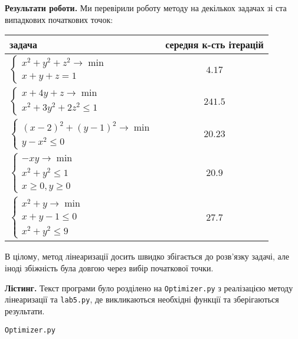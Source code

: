 \documentclass{extreport}
\begin{document}
\newpage
\noindent\textbf{Результати роботи.} Ми перевірили роботу методу на декількох задачах зі ста випадкових початкових точок:
\begin{center}
    \begin{tabular}{|l|c|}
        \hline
        \textbf{задача} & \textbf{середня к-сть ітерацій} \\
        \hline
        $\begin{cases}
            x^2 + y^2 + z^2 \to \min \\
            x + y + z = 1
        \end{cases}$ & $4.17$ \\
        \hline
        $\begin{cases}
            x + 4y + z \to \min \\
            x^2 + 3y^2 + 2z^2 \leq 1
        \end{cases}$ & $241.5$ \\
        \hline
        $\begin{cases}
            (x-2)^2 + (y-1)^2 \to \min \\
            y - x^2 \leq 0
        \end{cases}$ & $20.23$ \\
        \hline 
        $\begin{cases}
            -xy \to \min \\
            x^2 + y^2 \leq 1 \\
            x \geq 0, y \geq 0
        \end{cases}$ & $20.9$ \\
        \hline
        $\begin{cases}
            x^2 + y \to \min \\
            x + y - 1 \leq 0 \\
            x^2 + y^2 \leq 9
        \end{cases}$ & $27.7$ \\
        \hline  
    \end{tabular}
\end{center}

В цілому, метод лінеаризації досить швидко збігається до розв'язку задачі,
але іноді збіжність була довгою через вибір початкової точки.

\noindent\textbf{Лістинг.}
Текст програми було розділено на \texttt{Optimizer.py} з реалізацією
методу лінеаризації та \texttt{lab5.py}, де викликаються необхідні функції та зберігаються результати.

\noindent\texttt{Optimizer.py}

\end{document}
